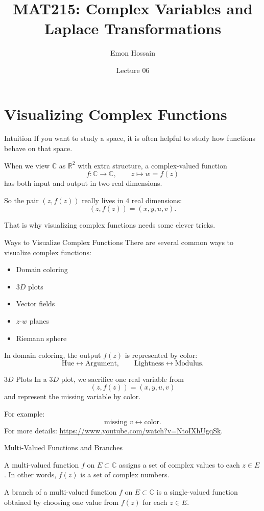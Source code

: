 \documentclass[11pt]{beamer}
\title[MAT215]{MAT215: Complex Variables and Laplace Transformations}
\author[Emon Hossain]{Emon Hossain}
\institute[University of Dhaka]{Lecturer\\MNS Department\\BRAC University}
\date{Lecture 06}
\theoremstyle{definition}
\theoremstyle{plain}
\newcommand{\C}{\mathbb{C}}
\newcommand{\R}{\mathbb{R}}
\begin{document}
\begin{frame}
\titlepage
\end{frame}

\section{Visualizing Complex Functions}

\begin{frame}{Intuition}
If you want to study a space, it is often helpful to study how functions behave on that space.

When we view \(\C\) as \(\R^2\) with extra structure, a complex-valued function
\[
f:\C\to\C,\qquad z\mapsto w=f(z)
\]
has both input and output in two real dimensions.

So the pair \((z,f(z))\) really lives in \(4\) real dimensions:
\[
(z,f(z))=(x,y,u,v).
\]

That is why visualizing complex functions needs some clever tricks.
\end{frame}

\begin{frame}{Ways to Visualize Complex Functions}
There are several common ways to visualize complex functions:
\begin{itemize}
    \item Domain coloring
    \item \(3D\) plots
    \item Vector fields
    \item \(z\)-\(w\) planes
    \item Riemann sphere
\end{itemize}

In domain coloring, the output \(f(z)\) is represented by color:
\[
\text{Hue}\leftrightarrow\text{Argument},
\qquad
\text{Lightness}\leftrightarrow\text{Modulus}.
\]
\end{frame}

\begin{frame}{\(3D\) Plots}
In a \(3D\) plot, we sacrifice one real variable from
\[
(z,f(z))=(x,y,u,v)
\]
and represent the missing variable by color.

For example:
\[
\text{missing }v \leftrightarrow \text{color}.
\]
For more details: \url{https://www.youtube.com/watch?v=NtoIXhUgqSk}.
\end{frame}

\begin{frame}{Multi-Valued Functions and Branches}
\begin{definition}
A multi-valued function \(f\) on \(E\subset \C\) assigns a set of complex values to each \(z\in E\). In other words, \(f(z)\) is a set of complex numbers.
\end{definition}

\begin{definition}
A branch of a multi-valued function \(f\) on \(E\subset \C\) is a single-valued function obtained by choosing one value from \(f(z)\) for each \(z\in E\).
\end{definition}
\end{frame}
\end{document}
